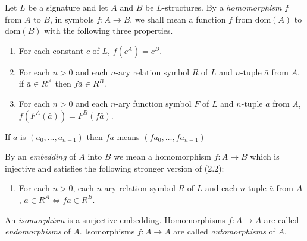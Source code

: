 \begin{definition}[Homomorphism]\label{def:homomorphism}
    Let \( L \) be a signature and let \( A \) and \( B \) be \( L \)-structures. By a \emph{homomorphism} \( f \) from \( A \) to \( B \), in symbols \( f\colon A \to B \), we shall mean a function \( f \) from \( \mathrm{dom}(A) \) to \( \mathrm{dom}(B) \) with the following three properties.

    \begin{enumerate}
        \item[(2.1)]\label{def:homomorphism-const}
              For each constant \( c \) of \( L \), \( f(c^A) = c^B \).

        \item[(2.2)]\label{def:homomorphism-rel}
              For each \( n > 0 \) and each \( n \)-ary relation symbol \( R \) of \( L \) and \( n \)-tuple \( \bar{a} \) from \( A \), if \( \bar{a} \in R^A \) then \( f\bar{a} \in R^B \).

        \item[(2.3)]\label{def:homomorphism-func}
              For each \( n > 0 \) and each \( n \)-ary function symbol \( F \) of \( L \) and \( n \)-tuple \( \bar{a} \) from \( A \), \( f(F^A(\bar{a})) = F^B(f\bar{a}) \).
    \end{enumerate}

\end{definition}

\begin{note}
    If \( \bar{a} \) is \( (a_0, \ldots, a_{n-1}) \) then \( f\bar{a} \) means \( (fa_0, \ldots, fa_{n-1}) \)
\end{note}



\begin{definition}[embedding]
    By an \emph{embedding} of \( A \) into \( B \) we mean a homomorphism \( f\colon A \to B \) which is injective and satisfies the following stronger version of (2.2):

    \begin{enumerate}
        \item[(2.4)] For each \( n > 0 \), each \( n \)-ary relation symbol \( R \) of \( L \) and each \( n \)-tuple \( \bar{a} \) from \( A \), \( \bar{a} \in R^A \Leftrightarrow f\bar{a} \in R^B \).
    \end{enumerate}

\end{definition}

An \emph{isomorphism} is a surjective embedding. Homomorphisms \( f\colon A \to A \) are called \emph{endomorphisms} of \( A \). Isomorphisms \( f\colon A \to A \) are called \emph{automorphisms} of \( A \).

